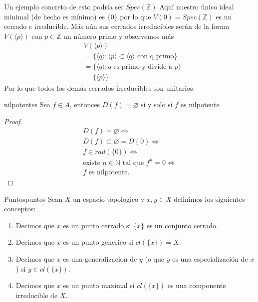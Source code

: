 \documentclass[14pt]{extarticle}
\begin{document}
\begin{ejemplo}{}{}
    Un ejemplo concreto de esto podría ser $Spec(\mathbb{Z})$
    Aquí nuestro único ideal minimal (de hecho es mínimo) es 
    $\{0\}$ por lo que $V(0) = Spec(\mathbb{Z})$ es un cerrado
    e irreducible. Más aún sus cerrados irreducibles serán de
    la forma $V(\langle p \rangle)$ con $p \in \mathbb{Z}$ un
    número primo y observemos más
    \begin{align*}
        &V(\langle p \rangle)\\ 
        &= \{\langle q \rangle; \langle p \rangle
        \subset \langle q\rangle \mbox{ con q primo}\}\\
        &=\{\langle q \rangle; q \mbox{ es primo y divide a } p\}\\
        &=\{\langle p \rangle\}
    \end{align*} 
    Por lo que todos los demás cerrados irreducibles son unitarios.

\end{ejemplo}

\begin{proposicion}{}{nilpotentes}
    Sea $f\in A$, entonces $D(f) = \varnothing$
    si y solo si $f$ es nilpotente
\end{proposicion}
\begin{proof}
    \begin{align*}
        D(f) = \varnothing \iff \\
        D(f) \subset \varnothing = D(0) \iff \\
        f \in rad(\{0\}) \iff \\
        \mbox{existe }n\in\mathbb{N} \mbox{ tal que }
        f^n = 0 \iff \\
        f \mbox{ es nilpotente.}
    \end{align*}
\end{proof}

\begin{definicion}{Puntos}{puntos}
    Sean $X$ un espacio topologico y $x,y \in X$
    definimos los siguientes conceptos:
    \begin{enumerate}
        \item Decimos que $x$ es un punto cerrado
        si $\{x\}$ es un conjunto cerrado.
        \item Decimos que $x$ es un punto generico
        si $cl(\{x\}) = X$.
        \item Decimos que $x$ es una generalizacion
        de $y$ (o que $y$ es una especialización de $x$)
        si $y \in cl(\{x\})$.
        \item Decimos que $x$ es un punto maximal si 
        $cl(\{x\})$ es una componente irreducible de $X$.
    \end{enumerate}
\end{definicion}
\end{document}

